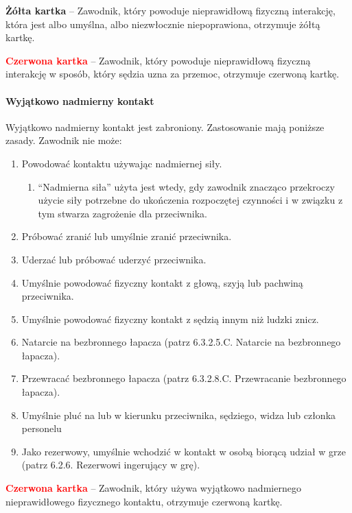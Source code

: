 \documentclass[12pt]{article}
\newcommand\redcard[1]{\bgroup\textcolor{red}{\textbf{#1}}}
\newcommand\yellowcard[1]{\bgroup\textcolor{darkyellow}{\textbf{#1}}}
\begin{document}
\yellowcard{Żółta kartka} -- Zawodnik, który powoduje nieprawidłową fizyczną
interakcję, która jest albo umyślna, albo niezwłocznie niepoprawiona,
otrzymuje żółtą kartkę.

\redcard{Czerwona kartka} -- Zawodnik, który powoduje nieprawidłową fizyczną
interakcję w sposób, który sędzia uzna za przemoc, otrzymuje czerwoną
kartkę.

\paragraph{Wyjątkowo nadmierny kontakt}
Wyjątkowo nadmierny
kontakt jest zabroniony. Zastosowanie mają poniższe zasady. Zawodnik nie
może:

\begin{enumerate}
	\item
	      Powodować kontaktu używając nadmiernej siły.

	      \begin{enumerate}
		      \item
		            ``Nadmierna siła'' użyta jest wtedy, gdy zawodnik znacząco
		            przekroczy użycie siły potrzebne do ukończenia rozpoczętej czynności
		            i w związku z tym stwarza zagrożenie dla przeciwnika.
	      \end{enumerate}
	\item
	      Próbować zranić lub umyślnie zranić przeciwnika.
	\item
	      Uderzać lub próbować uderzyć przeciwnika.
	\item
	      Umyślnie powodować fizyczny kontakt z głową, szyją lub pachwiną
	      przeciwnika.
	\item
	      Umyślnie powodować fizyczny kontakt z sędzią innym niż ludzki znicz.
	\item
	      Natarcie na bezbronnego łapacza (patrz 6.3.2.5.C. Natarcie na
	      bezbronnego łapacza).
	\item
	      Przewracać bezbronnego łapacza (patrz 6.3.2.8.C. Przewracanie
	      bezbronnego łapacza).
	\item
	      Umyślnie pluć na lub w kierunku przeciwnika, sędziego, widza lub
	      członka personelu
	\item
	      Jako rezerwowy, umyślnie wchodzić w kontakt w osobą biorącą udział w
	      grze (patrz 6.2.6. Rezerwowi ingerujący w grę).
\end{enumerate}

\redcard{Czerwona kartka} -- Zawodnik, który używa wyjątkowo nadmiernego
nieprawidłowego fizycznego kontaktu, otrzymuje czerwoną kartkę.
\end{document}
